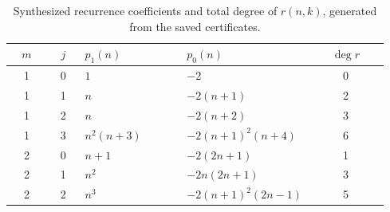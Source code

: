 \begin{longtable}{@{}ccp{0.27\linewidth}p{0.28\linewidth}c@{}}
\caption{Synthesized recurrence coefficients and total degree of $r(n,k)$, generated from the saved certificates.}\label{tab:recurrences}\\
\toprule
$m$ & $j$ & $p_1(n)$ & $p_0(n)$ & $\deg r$ \\
\midrule\endhead
1 & 0 & $1$ & $-2$ & 0 \\
1 & 1 & $n$ & $- 2 \left(n + 1\right)$ & 2 \\
1 & 2 & $n$ & $- 2 \left(n + 2\right)$ & 3 \\
1 & 3 & $n^{2} \left(n + 3\right)$ & $- 2 \left(n + 1\right)^{2} \left(n + 4\right)$ & 6 \\
2 & 0 & $n + 1$ & $- 2 \left(2 n + 1\right)$ & 1 \\
2 & 1 & $n^{2}$ & $- 2 n \left(2 n + 1\right)$ & 3 \\
2 & 2 & $n^{3}$ & $- 2 \left(n + 1\right)^{2} \left(2 n - 1\right)$ & 5 \\
\bottomrule
\end{longtable}
